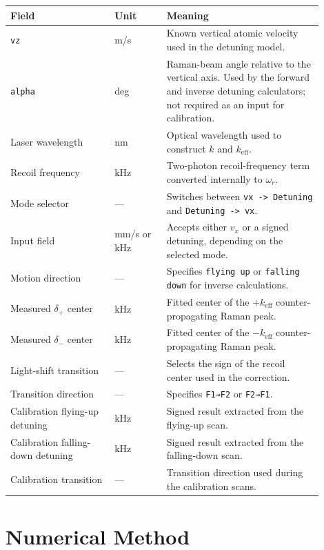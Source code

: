 \documentclass[11pt,a4paper]{article}
\begin{document}
\begin{longtable}{>{\raggedright\arraybackslash}p{0.30\linewidth} >{\raggedright\arraybackslash}p{0.15\linewidth} >{\raggedright\arraybackslash}p{0.45\linewidth}}
\toprule
Field & Unit & Meaning \\
\midrule
\texttt{vz} & m/s & Known vertical atomic velocity used in the detuning model. \\
\texttt{alpha} & deg & Raman-beam angle relative to the vertical axis. Used by the forward and inverse detuning calculators; not required as an input for calibration. \\
Laser wavelength & nm & Optical wavelength used to construct $k$ and $k_{\mathrm{eff}}$. \\
Recoil frequency & kHz & Two-photon recoil-frequency term converted internally to $\omega_r$. \\
Mode selector & --- & Switches between \texttt{vx -> Detuning} and \texttt{Detuning -> vx}. \\
Input field & mm/s or kHz & Accepts either $v_x$ or a signed detuning, depending on the selected mode. \\
Motion direction & --- & Specifies \texttt{flying up} or \texttt{falling down} for inverse calculations. \\
Measured $\delta_+$ center & kHz & Fitted center of the $+k_{\mathrm{eff}}$ counter-propagating Raman peak. \\
Measured $\delta_-$ center & kHz & Fitted center of the $-k_{\mathrm{eff}}$ counter-propagating Raman peak. \\
Light-shift transition & --- & Selects the sign of the recoil center used in the correction. \\
Transition direction & --- & Specifies \texttt{F1→F2} or \texttt{F2→F1}. \\
Calibration flying-up detuning & kHz & Signed result extracted from the flying-up scan. \\
Calibration falling-down detuning & kHz & Signed result extracted from the falling-down scan. \\
Calibration transition & --- & Transition direction used during the calibration scans. \\
\bottomrule
\end{longtable}

\section{Numerical Method}
\end{document}
